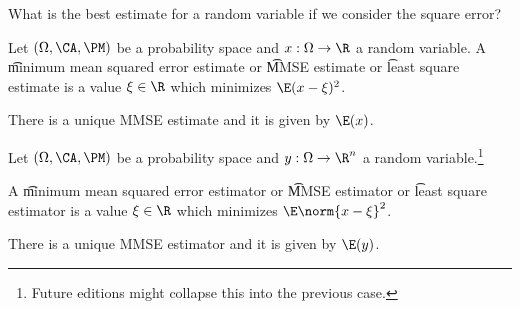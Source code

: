 

What is the best estimate for a random variable if we consider the square error?


Let $(\Omega, \CA, \PM)$ be a probability space and $x: \Omega \to \R$ a random variable.
A \t{minimum mean squared error estimate} or \t{MMSE estimate} or \t{least square estimate} is a value $\xi \in \R$ which minimizes $\E (x - \xi)^2$.

\begin{proposition}
  There is a unique MMSE estimate and it is given by $\E(x)$.
\end{proposition}


Let $(\Omega, \CA, \PM)$ be a probability space and $y: \Omega \to \R^n$ a random variable.\footnote{Future editions might collapse this into the previous case.}

A \t{minimum mean squared error estimator} or \t{MMSE estimator} or \t{least square estimator} is a value $\xi \in \R$ which minimizes $\E \norm{x - \xi}^2$.

\begin{proposition}
  There is a unique MMSE estimator and it is given by $\E(y)$.
\end{proposition}

\blankpage
